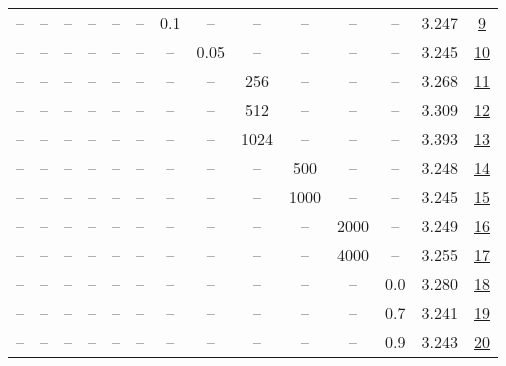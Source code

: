 \begin{table}[H]
\begin{tabular}{cccccccccccccc}
-- & -- & -- & -- & -- & -- & 0.1 & -- & -- & -- & -- & -- & 3.247 & \href{https://wandb.ai/stanford-mercury/optimizer-scaling/runs/sweep-300m-6B-kron2dfba4lr0.001-wd0.5-b10.95-plr0.1-pis1-gn1-nor-276c3b}{9} \\
-- & -- & -- & -- & -- & -- & -- & 0.05 & -- & -- & -- & -- & 3.245 & \href{https://wandb.ai/stanford-mercury/optimizer-scaling/runs/sweep-300m-6B-kron79a66dlr0.001-wd0.5-b10.95-plr0.2-pis1-gn1-nor-11f4a3}{10} \\
-- & -- & -- & -- & -- & -- & -- & -- & 256 & -- & -- & -- & 3.268 & \href{https://wandb.ai/stanford-mercury/optimizer-scaling/runs/sweep-300m-6B-kron3e44e0lr0.001-wd0.5-b10.95-plr0.2-pis1-gn1-nor-e9e4f3}{11} \\
-- & -- & -- & -- & -- & -- & -- & -- & 512 & -- & -- & -- & 3.309 & \href{https://wandb.ai/stanford-mercury/optimizer-scaling/runs/sweep-300m-6B-krond7d67alr0.001-wd0.5-b10.95-plr0.2-pis1-gn1-nor-85324c}{12} \\
-- & -- & -- & -- & -- & -- & -- & -- & 1024 & -- & -- & -- & 3.393 & \href{https://wandb.ai/stanford-mercury/optimizer-scaling/runs/sweep-300m-6B-kron8b18a1lr0.001-wd0.5-b10.95-plr0.2-pis1-gn1-nor-4605e0}{13} \\
-- & -- & -- & -- & -- & -- & -- & -- & -- & 500 & -- & -- & 3.248 & \href{https://wandb.ai/stanford-mercury/optimizer-scaling/runs/sweep-300m-6B-krondc1418lr0.001-wd0.5-b10.95-plr0.2-pis1-gn1-nor-f0e290}{14} \\
-- & -- & -- & -- & -- & -- & -- & -- & -- & 1000 & -- & -- & 3.245 & \href{https://wandb.ai/stanford-mercury/optimizer-scaling/runs/sweep-300m-6B-krona5b2cclr0.001-wd0.5-b10.95-plr0.2-pis1-gn1-nor-c5851e}{15} \\
-- & -- & -- & -- & -- & -- & -- & -- & -- & -- & 2000 & -- & 3.249 & \href{https://wandb.ai/stanford-mercury/optimizer-scaling/runs/sweep-300m-6B-kron624f48lr0.001-wd0.5-b10.95-plr0.2-pis1-gn1-nor-30df74}{16} \\
-- & -- & -- & -- & -- & -- & -- & -- & -- & -- & 4000 & -- & 3.255 & \href{https://wandb.ai/stanford-mercury/optimizer-scaling/runs/sweep-300m-6B-kron725c70lr0.001-wd0.5-b10.95-plr0.2-pis1-gn1-nor-641c26}{17} \\
-- & -- & -- & -- & -- & -- & -- & -- & -- & -- & -- & 0.0 & 3.280 & \href{https://wandb.ai/stanford-mercury/optimizer-scaling/runs/sweep-300m-6B-kron1939b5lr0.001-wd0.0-b10.95-plr0.2-pis1-gn1-nor-2af8b7}{18} \\
-- & -- & -- & -- & -- & -- & -- & -- & -- & -- & -- & 0.7 & 3.241 & \href{https://wandb.ai/stanford-mercury/optimizer-scaling/runs/sweep-300m-6B-kron0a397clr0.001-wd0.7-b10.95-plr0.2-pis1-gn1-nor-f6a567}{19} \\
-- & -- & -- & -- & -- & -- & -- & -- & -- & -- & -- & 0.9 & 3.243 & \href{https://wandb.ai/stanford-mercury/optimizer-scaling/runs/sweep-300m-6B-kron844b62lr0.001-wd0.9-b10.95-plr0.2-pis1-gn1-nor-5156e6}{20} \\
\bottomrule
\end{tabular}
\end{table}

